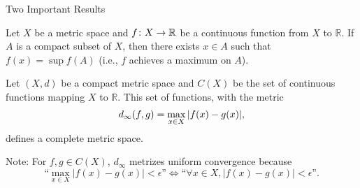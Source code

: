 \documentclass[10pt,english]{beamer}
\begin{document}
\begin{frame}{Two Important Results}

\begin{theorem}
Let $X$ be a metric space and $f \colon X\rightarrow \mathbb{R}$ be a continuous function from $X$ to $\mathbb{R}$.
If $A$ is a compact subset of $X$, then there exists $x\in A$ such that $f(x)=\sup f(A)$ (i.e., $f$ achieves a maximum on $A$).
\end{theorem}

\vspace{3mm}

\begin{theorem}
Let $(X,d)$ be a compact metric space and $C(X)$ be the set of continuous functions mapping $X$ to $\mathbb{R}$.
This set of functions, with the metric \vspace{-1.5mm} \[d_\infty (f,g)=\max_{x\in X} |f(x)-g(x)|, \vspace*{-1.5mm}\] defines a complete metric space.
\end{theorem}

Note: For $f,g\in C(X)$, $d_\infty$ metrizes uniform convergence because \vspace{-1.5mm} \[ \text{``}\max_{x\in X} |f(x)-g(x)| < \epsilon \text{''} \Leftrightarrow \text{``} \forall x\in X, |f(x) - g(x)| < \epsilon \text{''}. \]

\end{frame}
\end{document}
